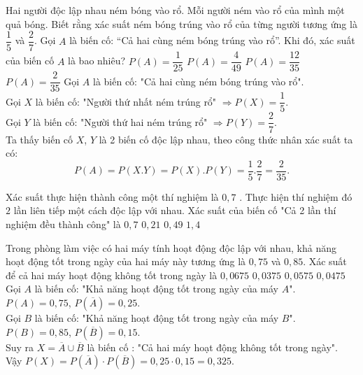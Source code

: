 \begin{ex} %
	Hai người độc lập nhau ném bóng vào rổ. Mỗi người ném vào rổ của mình một quả bóng. Biết rằng xác suất ném bóng trúng vào rổ của từng người tương ứng là $\dfrac{1}{5}$ và $\dfrac{2}{7}$. Gọi $A$ là biến cố: “Cả hai cùng ném bóng trúng vào rổ”. Khi đó, xác suất của biến cố $A$ là bao nhiêu?
	\choice
	{ $P( A )=\dfrac{1}{25}$}
	{ $P( A )=\dfrac{4}{49}$}
	{ $P( A )=\dfrac{12}{35}$}
	{ \True $P( A )=\dfrac{2}{35}$}
	\loigiai
	{
		Gọi $A$ là biến cố: "Cả hai cùng ném bóng trúng vào rổ".\\
		Gọi $X$ là biến cố: "Người thứ nhất ném trúng rổ" $\Rightarrow P( X )=\dfrac{1}{5}$.\\
		Gọi $Y$ là biến cố: "Người thứ hai ném trúng rổ" $\Rightarrow P( Y )=\dfrac{2}{7}$.\\
		Ta thấy biến cố $X$, $Y$ là 2 biến cố độc lập nhau, theo công thức nhân xác suất ta có:
		$$P(A)=P(X.Y )=P( X ).P( Y )=\dfrac{1}{5}.\dfrac{2}{7}=\dfrac{2}{35}.$$
	}
\end{ex}

\begin{ex} %
	Xác suất thực hiện thành công một thí nghiệm là $0,7$ . Thực hiện thí nghiệm đó $2$ lần liên tiếp một cách độc lập với nhau. Xác suất của biến cố "Cả 2 lần thí nghiệm đều thành công" là
	\choice
	{$0,7$}
	{$0,21$}
	{\True $0,49$}
	{$1,4$}
\end{ex}

\begin{ex} %
	Trong phòng làm việc có hai máy tính hoạt động độc lập với nhau, khả năng hoạt động tốt trong ngày của hai máy này tương ứng là $0,75$ và $0,85$. Xác suất để cả hai máy hoạt động không tốt trong ngày là
	\choice
	{ $0,0675$ }
	{ \True $0,0375$ }
	{$0,0575$}
	{ $0,0475$}
	\loigiai
	{
		Gọi $A$ là biến cố: "Khả năng hoạt động tốt trong ngày của máy $A$".\\
		$P(A)=0,75$, $P( \overline{A} )=0,25$.\\
		Gọi $B$ là biến cố: "Khả năng hoạt động tốt trong ngày của máy $B$".\\
		$P( B )=0,85$, $P( \overline{B})=0,15$.\\
		Suy ra $X=\overline{A}\cup \overline{B}$ là biến cố : "Cả hai máy hoạt động không tốt trong ngày".\\
		Vậy $P(X)=P(\overline{A})\cdot P( \overline{B})=0,25\cdot  0,15 =0,325$.
	}
\end{ex}

